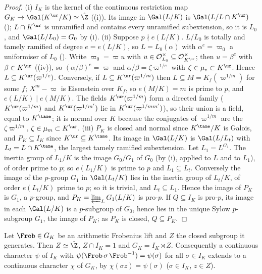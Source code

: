 \begin{proof}
(i) $I_K$ is the kernel of the continuous restriction map $G_K\to\Gal(K^{\ur}/K)\simeq\hat\Z$ ((i)). Its image in $\Gal(L/K)$ is
$\Gal(L/L\cap K^{\ur})$ (); $L\cap K^{\ur}$ is unramified and contains every unramified subextension, so it is $L_0$, and
$\Gal(L/L_0)=G_0$ by (i).
(ii) Suppose $p\nmid e(L/K)$. $L/L_0$ is totally and tamely ramified of degree $e=e(L/K)$, so $L=L_0(\alpha)$ with $\alpha^e=\varpi_0$ a uniformiser of $L_0$
(). Write $\varpi_0=\varpi u$ with $u\in\mathcal O_{L_0}^\times\subseteq\mathcal O_{K^{\ur}}^\times$; then $u=\beta^e$ with
$\beta\in K^{\ur}$ ((iv)), so $(\alpha/\beta)^e=\varpi$ and $\alpha/\beta=\zeta\varpi^{1/e}$ with $\zeta\in\mu_e\subset K^{\ur}$. Hence $L\subseteq
K^{\ur}(\varpi^{1/e})$. Conversely, if $L\subseteq K^{\ur}(\varpi^{1/m})$ then $L\subseteq M=K_f(\varpi^{1/m})$ for some $f$; $X^m-\varpi$ is Eisenstein over
$K_f$, so $e(M/K)=m$ is prime to $p$, and $e(L/K)\mid e(M/K)$. The fields $K^{\ur}(\varpi^{1/m})$ form a directed family ($K^{\ur}(\varpi^{1/m})$ and
$K^{\ur}(\varpi^{1/m'})$ lie in $K^{\ur}(\varpi^{1/mm'})$), so their union is a field, equal to $K^{\tame}$; it is normal over $K$ because the conjugates of
$\varpi^{1/m}$ are the $\zeta\varpi^{1/m}$, $\zeta\in\mu_m\subset K^{\ur}$.
(iii) $P_K$ is closed and normal since $K^{\tame}/K$ is Galois, and $P_K\subseteq I_K$ since $K^{\ur}\subseteq K^{\tame}$. Its image in $\Gal(L/K)$ is
$\Gal(L/L_t)$ with $L_t=L\cap K^{\tame}$, the largest tamely ramified subextension. Let $L_1=L^{G_1}$. The inertia group of $L_1/K$ is the image $G_0/G_1$
of $G_0$ (by (i), applied to $L$ and to $L_1$), of order prime to $p$; so $e(L_1/K)$ is prime to $p$ and $L_1\subseteq L_t$. Conversely the image of the
$p$-group $G_1$ in $\Gal(L_t/K)$ lies in the inertia group of $L_t/K$, of order $e(L_t/K)$ prime to $p$; so it is trivial, and $L_t\subseteq L_1$. Hence
the image of $P_K$ is $G_1$, a $p$-group, and $P_K=\varprojlim_LG_1(L/K)$ is pro-$p$. If $Q\subseteq I_K$ is pro-$p$, its image in each $\Gal(L/K)$ is a
$p$-subgroup of $G_0$, hence lies in the unique Sylow $p$-subgroup $G_1$, the image of $P_K$; as $P_K$ is closed, $Q\subseteq P_K$.
\end{proof}

\begin{corollary}\label{cor:local:split}
Let $\Frob\in G_K$ be an arithmetic Frobenius lift and $Z$ the closed subgroup it generates. Then $Z\simeq\hat\Z$, $Z\cap I_K=1$ and
$G_K=I_K\rtimes Z$. Consequently a continuous character $\psi$ of $I_K$ with $\psi(\Frob\,\sigma\,\Frob^{-1})=\psi(\sigma)$ for all $\sigma\in I_K$ extends to a continuous
character $\chi$ of $G_K$, by $\chi(\sigma z)=\psi(\sigma)$ ($\sigma\in I_K$, $z\in Z$).
\end{corollary}


